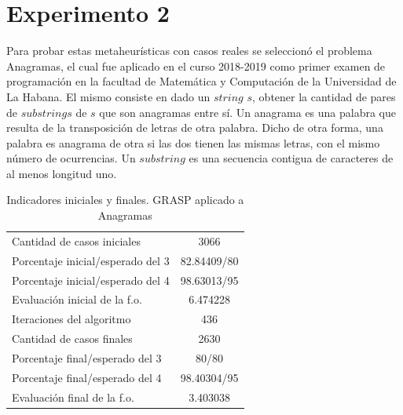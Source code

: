 \documentclass[a4paper,12pt]{book}
\begin{document}
	\section{Experimento 2}
		Para probar estas metaheurísticas con casos reales se seleccionó el problema Anagramas, el cual fue aplicado en el curso 2018-2019 como primer examen de programación en la facultad de Matemática y Computación de la Universidad de La Habana. El mismo consiste en dado un $string$ $s$, obtener la cantidad de pares de $substrings$ de $s$ que son anagramas entre sí. Un anagrama es una palabra que resulta de la transposición de letras de otra palabra. Dicho de otra forma, una palabra es anagrama de otra si las dos tienen las mismas letras, con el mismo número de ocurrencias. Un $substring$ es una secuencia contigua de caracteres de al menos longitud uno.
		
		\begin{table}[h]
			\begin{center}
				\begin{tabular}{| l | c |} \hline
					Cantidad de casos iniciales & 3066 \\
					Porcentaje inicial/esperado del 3 & 82.84409/80 \\
					Porcentaje inicial/esperado del 4 & 98.63013/95 \\
					Evaluación inicial de la f.o. & 6.474228 \\ \hline
					Iteraciones del algoritmo & 436 \\ \hline
					Cantidad de casos finales & 2630 \\
					Porcentaje final/esperado del 3 & 80/80 \\
					Porcentaje final/esperado del 4 & 98.40304/95 \\
					Evaluación final de la f.o. & 3.403038 \\ \hline
				\end{tabular}
				\caption{Indicadores iniciales y finales. GRASP aplicado a Anagramas}
				\label{tab:IndicadoresAnaGRASP1}
			\end{center}
		\end{table}
	
\end{document}
